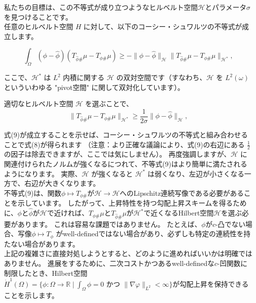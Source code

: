 \documentclass{jsarticle}
\theoremstyle{definition}
\begin{document}
\color{black}

私たちの目標は、この不等式が成り立つようなヒルベルト空間$\mathcal{H}$とパラメータ$\sigma$を見つけることです。\\

任意のヒルベルト空間 $H$ に対して、以下のコーシー・シュワルツの不等式が成立します。

\begin{equation*}
  \int_\Omega (\phi - \hat{\phi})(T_{\hat{\phi} \#} \mu - T_{\phi \#} \mu) \geq - \|\phi - \hat{\phi}\|_{\mathcal{H}} \|T_{\hat{\phi} \#} \mu - T_{\phi \#} \mu\|_{\mathcal{H}^*},
\end{equation*}

ここで、$\mathcal{H}^*$ は $L^2$ 内積に関する $\mathcal{H}$  の双対空間です（すなわち、$\mathcal{H}$  を $L^2(\omega)$ といういわゆる "pivot空間" に関して双対化しています）。


適切なヒルベルト空間 $\mathcal{H}$ を選ぶことで、
\begin{equation}
  \|T_{\hat{\phi} \#} \mu - T_{\phi \#} \mu\|_{\mathcal{H}^*} \geq \frac{1}{2 \sigma} \|\phi - \hat{\phi}\|_\mathcal{H} ,
\end{equation}

式(9)が成立することを示せば、コーシー・シュワルツの不等式と組み合わせることで式(8)が得られます
（注意：より正確な議論により、式(9)の右辺にある $\frac{1}{2}$ の因子は除去できますが、ここでは気にしません）。
再度強調しますが、$\mathcal{H}$ に関連付けられたノルムが強くなるにつれて、不等式(9)はより簡単に満たされるようになります。
実際、$\mathcal{H}$ が強くなると $\mathcal{H}^*$ は弱くなり、左辺が小さくなる一方で、右辺が大きくなります。\\

不等式(9)は、関数$\phi \mapsto T_{\phi \#}$が$\mathcal{H} \to \mathcal{H}$へのLipschitz連続写像である必要があることを示しています。
したがって、上昇特性を持つ勾配上昇スキームを得るために、$\phi$と$\hat{\phi}$が$\mathcal{H}$で近ければ、$T_{\phi \#} \mu$と$T_{\hat{\phi} \#} \mu$が$\mathcal{H}^*$で近くなるHilbert空間$\mathcal{H}$を選ぶ必要があります。
これは容易な課題ではありません。
たとえば、$\phi$が$c$-凸でない場合、写像$\phi \mapsto T_\phi$ がwell-definedではない場合があり、必ずしも特定の連続性を持たない場合があります。\\


上記の複雑さに直接対処しようとすると、どのように進めればいいかは明確ではありません。
進展をするために、二次コストかつあるwell-definedな$c$-凹関数に制限したとき、Hilbert空間$\dot{H}^1(\Omega)=\{\phi:\Omega\to\mathbb{R} \mid \int_\Omega \phi = 0 \text{ かつ } \|\nabla \varphi\|_{L^2}<\infty\}$が勾配上昇を保持できることを示します。
\end{document}
